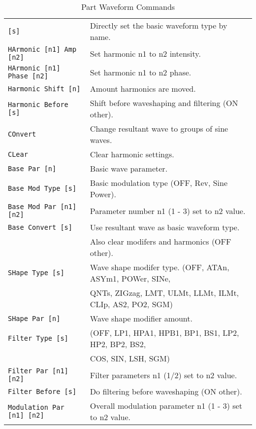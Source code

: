    \begin{table}[H]
      \centering
      \caption{Part Waveform Commands}
      \label{table:yoshimi_part_waveform_commands}
      \begin{tabular}{l l}

   \texttt{[s]} &
      Directly set the basic waveform type by name. \\
   \texttt{HArmonic [n1] Amp [n2]} &
      Set harmonic n1 to n2 intensity. \\
   \texttt{HArmonic [n1] Phase [n2]} &
      Set harmonic n1 to n2 phase. \\
   \texttt{Harmonic Shift [n]} &
      Amount harmonics are moved. \\
   \texttt{Harmonic Before [s]} &
      Shift before waveshaping and filtering (ON other). \\
   \texttt{COnvert} &
       Change resultant wave to groups of sine waves. \\
   \texttt{CLear} &
      Clear harmonic settings. \\
   \texttt{Base Par [n]} &
      Basic wave parameter. \\
   \texttt{Base Mod Type [s]} &
      Basic modulation type (OFF, Rev, Sine Power). \\
   \texttt{Base Mod Par [n1] [n2]} &
       Parameter number n1 (1 - 3) set to n2 value. \\
   \texttt{Base Convert [s]} &
       Use resultant wave as basic waveform type. \\
   \texttt{} &
      Also clear modifers and harmonics (OFF other). \\
   \texttt{SHape Type [s] } &
      Wave shape modifer type. (OFF, ATAn, ASYm1, POWer, SINe,\\
   \texttt{} &
       QNTs, ZIGzag, LMT, ULMt, LLMt, ILMt, CLIp, AS2, PO2, SGM) \\
   \texttt{SHape Par [n]} &
      Wave shape modifier amount. \\
   \texttt{Filter Type [s]} &
      (OFF, LP1, HPA1, HPB1, BP1, BS1, LP2, HP2, BP2, BS2, \\
      \texttt{} &
      COS, SIN, LSH, SGM)\\
   \texttt{Filter Par [n1] [n2]} &
      Filter parameters  n1 (1/2) set to n2 value. \\
   \texttt{Filter Before [s]} &
      Do filtering before waveshaping (ON other). \\
   \texttt{Modulation Par [n1] [n2]} &
      Overall modulation parameter n1 (1 - 3) set to n2 value. \\

\end{tabular}
\end{table}
